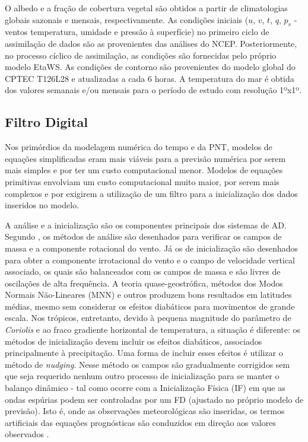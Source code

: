 O albedo e a fração de cobertura vegetal são obtidos a partir de climatologias globais sazonais e mensais, respectivamente. As condições iniciais ($u$, $v$, $t$, $q$, $p_{s}$ - ventos temperatura, umidade e pressão à superfície) no primeiro ciclo de assimilação de dados são as provenientes das análises do NCEP. Posteriormente, no processo cíclico de assimilação, as condições são fornecidas pelo próprio modelo EtaWS. As condições de contorno são provenientes do modelo global do CPTEC T126L28 e atualizadas a cada 6 horas. A temperatura do mar é obtida dos valores semanais e/ou mensais para o período de estudo com resolução 1ºx1º.

\subsection{Filtro Digital}

Nos primórdios da modelagem numérica do tempo e da PNT, modelos de equações simplificadas eram mais viáveis para a previsão numérica por serem mais simples e por ter um custo computacional menor. Modelos de equações primitivas envolviam um custo computacional muito maior, por serem mais complexos e por exigirem a utilização de um filtro para a inicialização dos dados inseridos no modelo. 

A análise e a inicialização são os componentes principais dos sistemas de AD. Segundo , os métodos de análise são desenhados para verificar os campos de massa e a componente rotacional do vento. Já os de inicialização são desenhados para obter a componente irrotacional do vento e o campo de velocidade vertical associado, os quais são balanceados com os campos de massa e são livres de oscilações de alta frequência. A teoria quase-geostrófica, métodos dos Modos Normais Não-Lineares (MNN) e outros produzem bons resultados em latitudes médias, mesmo sem considerar os efeitos diabáticos para movimentos de grande escala. Nos trópicos, entretanto, devido à pequena magnitude do parâmetro de \textit{Coriolis} e ao fraco gradiente horizontal de temperatura, a situação é diferente: os métodos de inicialização devem incluir os efeitos diabáticos, associados principalmente à precipitação. Uma forma de incluir esses efeitos é utilizar o método de \textit{nudging}. Nesse método os campos são gradualmente corrigidos sem que seja requerido nenhum outro processo de inicialização para se manter o balanço dinâmico - tal como ocorre com a Inicialização Física (IF) em que as ondas espúrias podem ser controladas por um FD (ajustado no próprio modelo de previsão). Isto é, onde as observações meteorológicas são inseridas, os termos artificiais das equações prognósticas são conduzidos em direção aos valores observados \cite{kalnay03}. 

